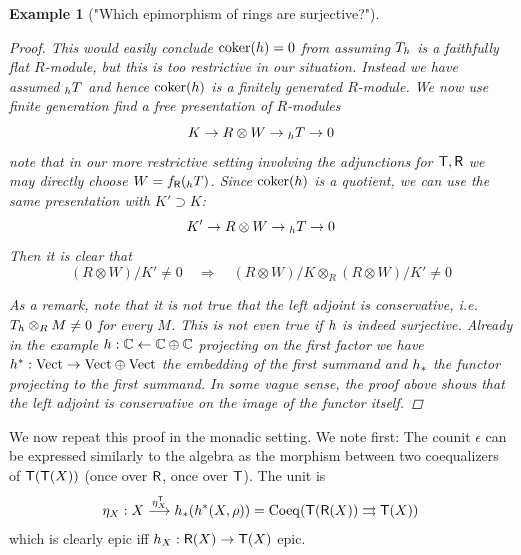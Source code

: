 \documentclass[a4paper, reqno]{amsart}
\newtheorem{example}[theorem]{Example}
\theoremstyle{introTheorems}
\newcommand{\coker}{\textup{coker}}
\newcommand{\Vect}{\textup{Vect}}
\renewcommand{\1}{\mathbbold{1}}
\begin{document}
\begin{example}["Which epimorphism of rings are surjective?"]
\begin{proof}
This would easily conclude $\coker(\fpullback)=0$ from assuming $T_h$ is a faithfully flat $R$-module, but this is too restrictive in our situation. Instead we have assumed ${_h}T$ and hence $\coker(\fpullback)$ is a finitely generated $R$-module. We now use finite generation find a free presentation of $R$-modules
$$K\to R\otimes W\to {_h}T\to 0$$
note that in our more restrictive setting involving the adjunctions for ${\mathsf{T}},{\mathsf{R}}$ we may directly choose $W=f_{\mathsf{R}}( {_h}T)$. Since $\coker(\fpullback)$ is a quotient, we can use the same presentation with $K'\supset K$:
$$K'\to R\otimes W\to {_h}T\to 0$$
Then it is clear that 
$$(R\otimes W)/K'\neq 0
\quad\Longrightarrow\quad 
(R\otimes W)/K \otimes_R (R\otimes W)/K' \neq 0
$$

As a remark, note that it is not true that the left adjoint is conservative, i.e. $T_h\otimes_R M\neq 0$ for every $M$. This is not even true if $h$ is indeed surjective. Already in the example $h:\mathbb{C}\leftarrow \mathbb{C}\oplus \mathbb{C}$ projecting on the first factor we have $\fpullback^*:\Vect\to \Vect\oplus \Vect$ the embedding of the first summand and $h_*$ the functor projecting to the first summand. In some vague sense, the proof above shows that the left adjoint is conservative on the image of the functor itself.


\end{proof}
\end{example}

We now repeat this proof in the monadic setting. We note first: The counit $\epsilon$ can be expressed similarly to the algebra as the morphism between two coequalizers of ${\mathsf{T}}({\mathsf{T}}(X))$ (once over ${\mathsf{R}}$, once over ${\mathsf{T}}$). The unit is 
$$\eta_X: X\stackrel{\eta^{\mathsf{T}}_X}{\longrightarrow} h_*(h^*(X,\rho))=\mathrm{Coeq}({\mathsf{T}}({\mathsf{R}}(X))\rightrightarrows {\mathsf{T}}(X))$$
which is clearly epic iff $h_X:{\mathsf{R}}(X)\to {\mathsf{T}}(X)$ epic. 

\bigskip
\end{document}
